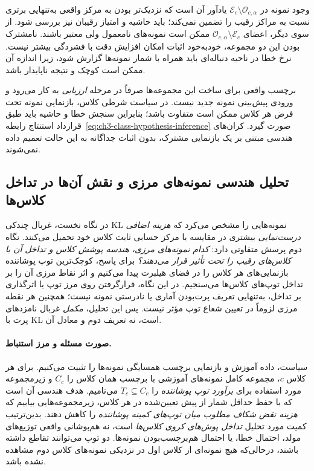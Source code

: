 وجود نمونه در
$\mathcal E_c\setminus\mathcal O_{c,\alpha}$
یادآور آن است که نزدیک‌تر بودن به مرکز واقعی
به‌تنهایی برتری نسبت به مراکز رقیب را تضمین نمی‌کند؛
باید حاشیه و امتیاز رقیبان نیز بررسی شود.
از سوی دیگر، اعضای
$\mathcal O_{c,\alpha}\setminus\mathcal E_c$
ممکن است نمونه‌های نامعمول ولی معتبر باشند.
نامشترک بودن این دو مجموعه، خودبه‌خود
اثبات امکان افزایش دقت با فشردگی بیشتر نیست.
نرخ خطا در ناحیه دنباله‌ای باید همراه با
شمار نمونه‌ها گزارش شود، زیرا اندازه آن
ممکن است کوچک و نتیجه ناپایدار باشد.

برچسب واقعی برای ساخت این مجموعه‌ها
صرفاً در مرحله \emph{ارزیابی} به کار می‌رود
و ورودی پیش‌بینی نمونه جدید نیست.
در سیاست شرطی کلاس، بازنمایی نمونه تحت
فرض هر کلاس ممکن است متفاوت باشد؛
بنابراین سنجش خطا و حاشیه باید طبق قرارداد
استنتاج رابطه~\eqref{eq:ch3-class-hypothesis-inference}
صورت گیرد. کران‌های هندسی مبتنی بر
یک بازنمایی مشترک، بدون اثبات جداگانه
به این حالت تعمیم داده نمی‌شوند.

\subsection{تحلیل هندسی نمونه‌های مرزی و نقش آن‌ها در تداخل کلاس‌ها}
\label{subsec:ch3-outlier-js-enclosing-balls}
در نگاه نخست، غربال چندکی KL
نمونه‌هایی را مشخص می‌کرد که
\emph{هزینه اضافی درست‌نمایی}
بیشتری در مقایسه با مرکز حسابی
ثابت کلاس خود تحمیل می‌کنند.
نگاه دوم پرسش متفاوتی دارد:
\emph{کدام نمونه‌های مرزی، هندسه
پوشش کلاس و تداخل آن با
کلاس‌های رقیب را تحت تأثیر
قرار می‌دهند؟}
برای پاسخ، کوچک‌ترین توپ
پوشاننده بازنمایی‌های هر کلاس
را در فضای هیلبرت پیدا می‌کنیم
و اثر نقاط مرزی آن را بر
تداخل توپ‌های کلاس‌ها می‌سنجیم.
در این نگاه، قرارگرفتن روی
مرز توپ یا اثرگذاری بر تداخل،
به‌تنهایی تعریف پرت‌بودن
آماری یا نادرستی نمونه نیست؛
همچنین هر نقطه مرزی لزوماً
در تعیین شعاع توپ مؤثر نیست.
پس این تحلیل، \emph{مکمل}
غربال نامزدهای پرت با KL است،
نه تعریف دوم و معادل آن.

\paragraph{صورت مسئله و مرز استنباط.}
سیاست، داده آموزش و بازنمایی
برچسب همسایگی نمونه‌ها را
تثبیت می‌کنیم. برای هر کلاس
$c$، مجموعه کامل نمونه‌های
آموزشی با برچسب همان کلاس را
$C_c$ و زیرمجموعه مورد استفاده
برای \emph{برآورد توپ پوشاننده}
را $T_c\subseteq C_c$ می‌نامیم.
هدف هندسی آن است که با حفظ
حداقل شمار از پیش تعیین‌شده
در هر کلاس، زیرمجموعه‌هایی
بیابیم که \emph{هزینه نقض شکاف
مطلوب میان توپ‌های کمینه
پوشاننده} را کاهش دهند.
بدین‌ترتیب کمیت مورد تحلیل
\emph{تداخل پوش‌های کروی کلاس‌ها}
است، نه هم‌پوشانی واقعی
توزیع‌های مولد، احتمال خطا،
یا احتمال هم‌برچسب‌بودن
نمونه‌ها. دو توپ می‌توانند
تقاطع داشته باشند، درحالی‌که
هیچ نمونه‌ای از کلاس اول
در نزدیکی نمونه‌های کلاس
دوم مشاهده نشده باشد.

